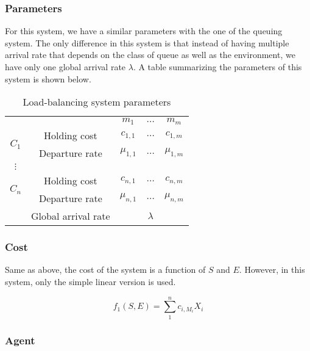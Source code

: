 \documentclass[
  a4paper, xcolor = usenames,dvipsnames]{article}
\begin{document}
\hypertarget{parameters-1}{%
\subsubsection{Parameters}\label{parameters-1}}

For this system, we have a similar parameters with the one of the queuing system. The only difference in this system is that instead of having multiple arrival rate that depends on the class of queue as well as the environment, we have only one global arrival rate \(\lambda\). A table summarizing the parameters of this system is shown below.

\begin{table}[ht]
\caption{Load-balancing system parameters}
\begin{center}
\begin{tabular}{c c c c c}
    \hline
    \multicolumn{2}{c}{} & $m_{1}$ & $\dots$ & $m_{m}$ \\
    \cline{2-5}
    \multirow{2}{*}{$C_{1}$} &  Holding cost & $c_{1, 1}$ & $\dots$ & $c_{1, m}$ \\
    & Departure rate & $\mu_{1, 1}$ & $\dots$ & $\mu_{1, m}$ \\
    \cline{2-5}
    $\vdots$  \\
    \cline{2-5}
    \multirow{2}{*}{$C_{n}$} &  Holding cost & $c_{n, 1}$ & $\dots$ & $c_{n, m}$ \\
    & Departure rate & $\mu_{n, 1}$ & $\dots$ & $\mu_{n, m}$ \\
    \cline{2-5}
    & Global arrival rate & & $\lambda$ & \\
    \hline
\end{tabular}
\end{center}
\label{tab:lbs-param}
\end{table}

\hypertarget{cost-1}{%
\subsubsection{Cost}\label{cost-1}}

Same as above, the cost of the system is a function of \(S\) and \(E\). However, in this system, only the simple linear version is used.

\[
f_{1}(S, E) = \sum_{1}^{n} c_{i, M_{i}} X_{i}
\]

\hypertarget{agent-1}{%
\subsubsection{Agent}\label{agent-1}}
\end{document}
